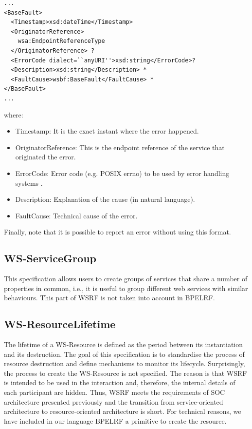 \begin{lstlisting}
...
<BaseFault> 
  <Timestamp>xsd:dateTime</Timestamp> 
  <OriginatorReference> 
    wsa:EndpointReferenceType 
  </OriginatorReference> ? 
  <ErrorCode dialect=``anyURI''>xsd:string</ErrorCode>? 
  <Description>xsd:string</Description> * 
  <FaultCause>wsbf:BaseFault</FaultCause> * 
</BaseFault>
...
\end{lstlisting}
where:

\begin{itemize}
\item Timestamp: It is the exact instant where the error happened.
\item OriginatorReference: This is the endpoint reference of the service that originated the error.
\item ErrorCode: Error code (e.g. POSIX errno) to be used by error handling systems .
\item Description: Explanation of the cause (in natural language).
\item FaultCause: Technical cause of the error. 
\end{itemize}
Finally, note that it is possible to report an error without using this format. %
\subsection*{WS-ServiceGroup}
This specification allows users to create groups of services 
that share a number of properties in common, i.e., it is useful to group different web services with similar behaviours.
This part of WSRF is not taken into account in BPELRF.

\subsection*{WS-ResourceLifetime}
The lifetime of a WS-Resource is defined as the period between its instantiation and its destruction. 
The goal of this specification is to standardise the process of resource destruction
and define mechanisms to monitor its lifecycle. Surprisingly, the process to create the WS-Resource
is not specified. The reason is that WSRF is intended to be used in the interaction and, therefore, the 
internal details of each participant are hidden. Thus, WSRF meets the requirements of SOC
architecture presented previously and the transition from service-oriented architecture to resource-oriented
architecture is short. For technical reasons, we have included in our language
BPELRF a primitive to create the resource. 

